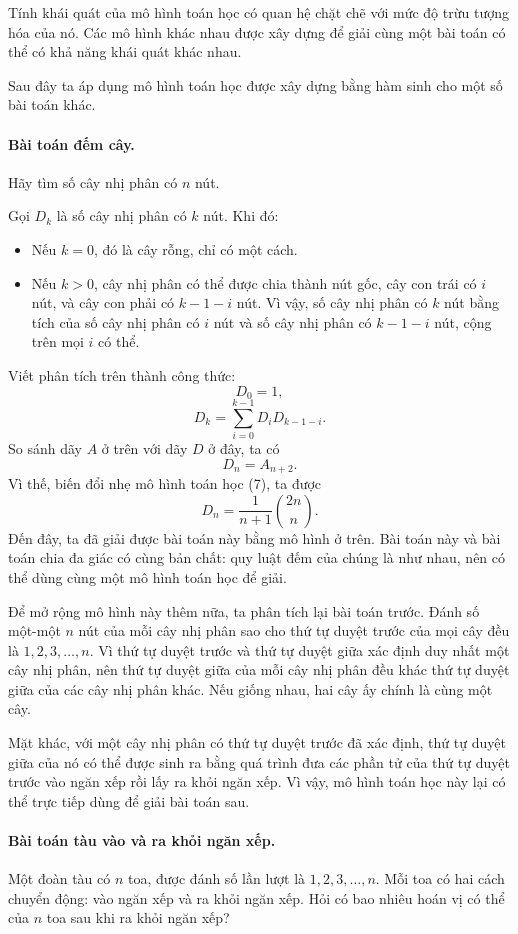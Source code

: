 \documentclass[11pt]{article}
\begin{document}
Tính khái quát của mô hình toán học có quan hệ chặt chẽ với mức độ trừu tượng
hóa của nó. Các mô hình khác nhau được xây dựng để giải cùng một bài toán có
thể có khả năng khái quát khác nhau.

Sau đây ta áp dụng mô hình toán học được xây dựng bằng hàm sinh cho một số
bài toán khác.

\paragraph{Bài toán đếm cây.}
Hãy tìm số cây nhị phân có \(n\) nút.

Gọi \(D_k\) là số cây nhị phân có \(k\) nút. Khi đó:
\begin{itemize}
  \item Nếu \(k=0\), đó là cây rỗng, chỉ có một cách.
  \item Nếu \(k>0\), cây nhị phân có thể được chia thành nút gốc, cây con
  trái có \(i\) nút, và cây con phải có \(k-1-i\) nút. Vì vậy, số cây nhị
  phân có \(k\) nút bằng tích của số cây nhị phân có \(i\) nút và số cây nhị
  phân có \(k-1-i\) nút, cộng trên mọi \(i\) có thể.
\end{itemize}

Viết phân tích trên thành công thức:
\[
  D_0=1,
\]
\[
  D_k=\sum_{i=0}^{k-1} D_iD_{k-1-i}.
\]
So sánh dãy \(A\) ở trên với dãy \(D\) ở đây, ta có
\[
  D_n=A_{n+2}.
\]
Vì thế, biến đổi nhẹ mô hình toán học (7), ta được
\[
  D_n=\frac{1}{n+1}\binom{2n}{n}. \tag{8}
\]
Đến đây, ta đã giải được bài toán này bằng mô hình ở trên. Bài toán này và
bài toán chia đa giác có cùng bản chất: quy luật đếm của chúng là như nhau,
nên có thể dùng cùng một mô hình toán học để giải.

Để mở rộng mô hình này thêm nữa, ta phân tích lại bài toán trước. Đánh số
một-một \(n\) nút của mỗi cây nhị phân sao cho thứ tự duyệt trước của mọi cây
đều là \(1,2,3,\ldots,n\). Vì thứ tự duyệt trước và thứ tự duyệt giữa xác
định duy nhất một cây nhị phân, nên thứ tự duyệt giữa của mỗi cây nhị phân
đều khác thứ tự duyệt giữa của các cây nhị phân khác. Nếu giống nhau, hai cây
ấy chính là cùng một cây.

Mặt khác, với một cây nhị phân có thứ tự duyệt trước đã xác định, thứ tự
duyệt giữa của nó có thể được sinh ra bằng quá trình đưa các phần tử của thứ
tự duyệt trước vào ngăn xếp rồi lấy ra khỏi ngăn xếp. Vì vậy, mô hình toán
học này lại có thể trực tiếp dùng để giải bài toán sau.

\paragraph{Bài toán tàu vào và ra khỏi ngăn xếp.}
Một đoàn tàu có \(n\) toa, được đánh số lần lượt là \(1,2,3,\ldots,n\). Mỗi
toa có hai cách chuyển động: vào ngăn xếp và ra khỏi ngăn xếp. Hỏi có bao
nhiêu hoán vị có thể của \(n\) toa sau khi ra khỏi ngăn xếp?
\end{document}
